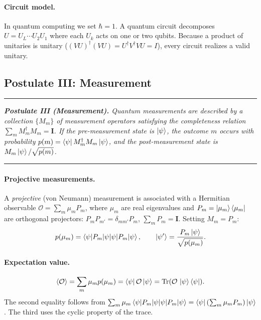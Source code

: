 \documentclass[aps, reprint, twocolumn, superscriptaddress, floatfix]{revtex4-2}
\newenvironment{statement}{%
  \par\addvspace{5pt}%
  \noindent\rule{\linewidth}{0.4pt}\nopagebreak\par\vspace{2pt}%
  \noindent\begingroup\small\itshape}{%
  \endgroup\par\vspace{2pt}\nopagebreak%
  \noindent\rule{\linewidth}{0.4pt}\par\addvspace{5pt}}
\begin{document}
\paragraph{Circuit model.}
In quantum computing we set $\hbar = 1$.  A quantum circuit decomposes
$U = U_L \cdots U_2 U_1$ where each $U_k$ acts on one or two qubits.  Because a product
of unitaries is unitary ($(VU)^\dagger(VU)=U^\dagger V^\dagger V U= I$),
every circuit realizes a valid unitary.

\subsection{Postulate III: Measurement}
\label{ssec:measurement}

\begin{statement}
\textbf{Postulate III (Measurement).}
Quantum measurements are described by a collection $\{M_m\}$ of measurement
operators satisfying the completeness relation $\sum_m M_m^\dagger M_m = \mathbf{I}$.
If the pre-measurement state is $\ket{\psi}$, the outcome $m$ occurs with
probability $p(m) = \bra{\psi}M_m^\dagger M_m\ket{\psi}$, and the
post-measurement state is $M_m\ket{\psi}/\sqrt{p(m)}$.
\end{statement}

\paragraph{Projective measurements.}
A \emph{projective} (von Neumann) measurement is associated with a Hermitian
observable $\mathcal{O} = \sum_m \mu_m P_m$, where $\mu_m$ are real eigenvalues
and $P_m = \ket{\mu_m}\bra{\mu_m}$ are orthogonal projectors:
$P_m P_{m'} = \delta_{mm'} P_m$, $\sum_m P_m = \mathbf{I}$.
Setting $M_m = P_m$:
\begin{equation}
  p(\mu_m) = \braket{\psi|P_m|\psi}, \qquad
  \ket{\psi'} = \frac{P_m\ket{\psi}}{\sqrt{p(\mu_m)}}.
\end{equation}

\paragraph{Expectation value.}
\begin{equation}
  \langle\mathcal{O}\rangle = \sum_m \mu_m p(\mu_m)
    = \bra{\psi}\mathcal{O}\ket{\psi}
    = \operatorname{Tr}(\mathcal{O}\,\ket{\psi}\bra{\psi}).
  \label{eq:expectation}
\end{equation}
The second equality follows from
$\sum_m \mu_m\braket{\psi|P_m|\psi} = \bra{\psi}(\sum_m \mu_m P_m)\ket{\psi}$.
The third uses the cyclic property of the trace.
\end{document}
